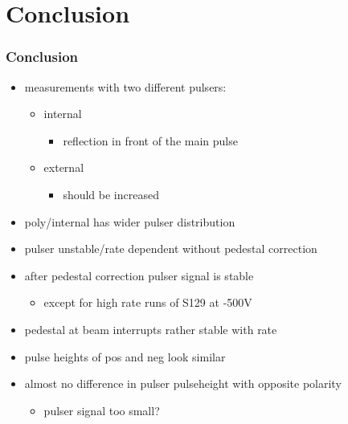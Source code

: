 \documentclass[9pt]{beamer}
\begin{document}
\section{Conclusion}
\begin{frame}
	\frametitle{Conclusion}
	\begin{itemize}
		\setlength{\itemsep}{\fill}	
		\item measurements with two different pulsers:
			\begin{itemize}
				\item internal
				\begin{itemize}
				  \item reflection in front of the main pulse
				\end{itemize}
				\item external
				\begin{itemize}
				  \item should be increased 
				\end{itemize}
			\end{itemize}
		\item poly/internal has wider pulser distribution
		\item pulser unstable/rate dependent without pedestal correction
		\item after pedestal correction pulser signal is stable
		\begin{itemize}
		  \item except for high rate runs of S129 at -500V 
		\end{itemize}
		\item pedestal at beam interrupts rather stable with rate
		\item pulse heights of pos and neg look similar
		\item almost no difference in pulser pulseheight with opposite polarity 
		\begin{itemize}
			\item pulser signal too small?
		\end{itemize}

	\end{itemize}
\end{frame}

\end{document}
